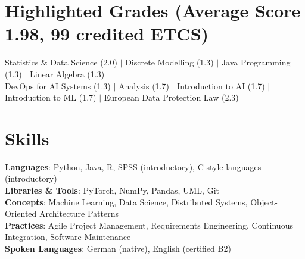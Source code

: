 \documentclass[letterpaper,11pt]{article}
\newif\ifgerman
\newcommand{\bi}[2]{\ifgerman#2\else#1\fi}
\begin{document}
\section{\bi{Highlighted Grades (Average Score 1.98}{Ausgewählte Noten (Notendurchschnitt 1,98}, \bi{99 credited ETCS}{99 angerechnete ETCS})}
 \begin{itemize}[leftmargin=0.15in, label={}]
    \small{\item{
     \bi
      {Statistics \& Data Science (2.0) $|$ Discrete Modelling (1.3) $|$ Java Programming (1.3) $|$ Linear Algebra (1.3) \\
       DevOps for AI Systems (1.3) $|$ Analysis (1.7) $|$ Introduction to AI (1.7) $|$ Introduction to ML (1.7) $|$ European Data Protection Law (2.3)}
      {Statistik \& Data Science (2,0) $|$ Diskrete Modellierung (1,3) $|$ Java-Programmierung (1,3) $|$ Lineare Algebra (1,3) \\
       DevOps für KI-Systeme (1,3) $|$ Analysis (1,7) $|$ Einführung in die KI (1,7) $|$ Einführung in ML (1,7), $|$ Europäisches Datenschutzrecht (2,3)}
    }}
 \end{itemize}


\section{\bi{Skills}{Kenntnisse}}
 \begin{itemize}[leftmargin=0.15in, label={}]
    \small{\item{
     \textbf{\bi{Languages}{Programmiersprachen}}{: \bi
       {Python, Java, R, SPSS (introductory), C-style languages (introductory)}
       {Python, Java, R, SPSS (Grundkenntnisse), C-artige Sprachen (Grundkenntnisse)}} \\
     \textbf{\bi{Libraries \& Tools}{Bibliotheken \& Werkzeuge}}{: PyTorch, NumPy, Pandas, UML, Git} \\
     \textbf{\bi{Concepts}{Konzepte}}{: \bi
       {Machine Learning, Data Science, Distributed Systems, Object-Oriented Architecture Patterns}
       {Maschinelles Lernen, Data Science, Verteilte Systeme, objektorientierte Architekturmuster}} \\
     \textbf{\bi{Practices}{Methoden}}{: \bi
       {Agile Project Management, Requirements Engineering, Continuous Integration, Software Maintenance}
       {Agiles Projektmanagement, Requirements Engineering, Continuous Integration, Softwarewartung}} \\
     \textbf{\bi{Spoken Languages}{Sprachen}}{: \bi
       {German (native), English (certified B2)}
       {Deutsch (Muttersprache), Englisch (zertifiziert B2)}} \\
    }}
 \end{itemize}


\end{document}
